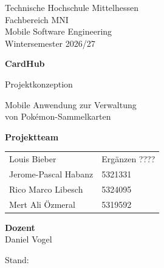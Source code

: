 \documentclass[11pt,a4paper]{article}
\newif\ifmockups
\begin{document}
\begin{titlepage}
Technische Hochschule Mittelhessen\\
Fachbereich MNI\\[8mm]
Mobile Software Engineering\\
Wintersemester 2026/27
\vspace{29mm}
\begin{center}
{\Huge\bfseries CardHub\par}
\vspace{6mm}
{\LARGE Projektkonzeption\par}
\vspace{8mm}
{\large Mobile Anwendung zur Verwaltung\\von Pokémon-Sammelkarten\par}
\end{center}
\vfill
\textbf{Projektteam}\\[3mm]
\begin{tabular}{@{}ll@{}}
Louis Bieber & Ergänzen ????\\
Jerome-Pascal Habanz & 5321331\\
Rico Marco Libesch & 5324095\\
Mert Ali Özmeral & 5319592
\end{tabular}
\vspace{10mm}

\textbf{Dozent}\\Daniel Vogel
\vspace{8mm}

Stand: \KonzeptStand
\end{titlepage}
\setcounter{page}{1}
\fontsize{10.8}{13.2}\selectfont

\clearpage

\clearpage

\clearpage

\clearpage

\clearpage

\clearpage


\clearpage
{}
\begingroup
\small


\endgroup
\clearpage
\appendix

\ifmockups
\clearpage
%
\fi
\end{document}
